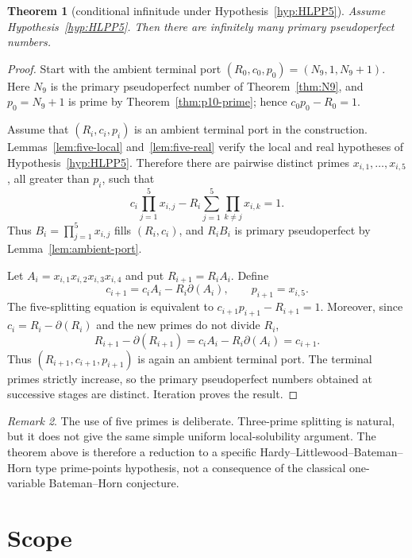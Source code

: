 \documentclass[11pt]{amsart}
\theoremstyle{plain}
\newtheorem{theorem}{Theorem}[section]
\theoremstyle{definition}
\theoremstyle{remark}
\newtheorem{remark}[theorem]{Remark}
\newcommand{\dd}{\partial}
\begin{document}
\begin{theorem}[conditional infinitude under Hypothesis~\ref{hyp:HLPP5}]\label{thm:conditional-infinitude}
Assume Hypothesis~\ref{hyp:HLPP5}.  Then there are infinitely many primary pseudoperfect numbers.
\end{theorem}

\begin{proof}
Start with the ambient terminal port $(R_0,c_0,p_0)=(N_9,1,N_9+1)$.  Here $N_9$ is the primary pseudoperfect number of Theorem~\ref{thm:N9}, and $p_0=N_9+1$ is prime by Theorem~\ref{thm:p10-prime}; hence $c_0p_0-R_0=1$.

Assume that $(R_i,c_i,p_i)$ is an ambient terminal port in the construction.  Lemmas~\ref{lem:five-local} and~\ref{lem:five-real} verify the local and real hypotheses of Hypothesis~\ref{hyp:HLPP5}.  Therefore there are pairwise distinct primes $x_{i,1},\ldots,x_{i,5}$, all greater than $p_i$, such that
\[
        c_i\prod_{j=1}^5x_{i,j}
        -R_i\sum_{j=1}^5\prod_{k\ne j}x_{i,k}=1.
\]
Thus $B_i=\prod_{j=1}^5x_{i,j}$ fills $(R_i,c_i)$, and $R_iB_i$ is primary pseudoperfect by Lemma~\ref{lem:ambient-port}.

Let $A_i=x_{i,1}x_{i,2}x_{i,3}x_{i,4}$ and put $R_{i+1}=R_iA_i$.  Define
\[
        c_{i+1}=c_iA_i-R_i\dd(A_i),
        \qquad
        p_{i+1}=x_{i,5}.
\]
The five-splitting equation is equivalent to $c_{i+1}p_{i+1}-R_{i+1}=1$.  Moreover, since $c_i=R_i-\dd(R_i)$ and the new primes do not divide $R_i$,
\[
        R_{i+1}-\dd(R_{i+1})=c_iA_i-R_i\dd(A_i)=c_{i+1}.
\]
Thus $(R_{i+1},c_{i+1},p_{i+1})$ is again an ambient terminal port.  The terminal primes strictly increase, so the primary pseudoperfect numbers obtained at successive stages are distinct.  Iteration proves the result.
\end{proof}

\begin{remark}
The use of five primes is deliberate.  Three-prime splitting is natural, but it does not give the same simple uniform local-solubility argument.  The theorem above is therefore a reduction to a specific Hardy--Littlewood--Bateman--Horn type prime-points hypothesis, not a consequence of the classical one-variable Bateman--Horn conjecture.
\end{remark}

\section{Scope}\label{sec:scope}
\end{document}
